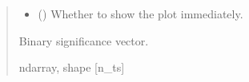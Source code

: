 \documentclass[letterpaper,10pt,english]{sphinxhowto}
\begin{document}
\begin{fulllineitems}
\begin{quote}
\begin{description}
\begin{itemize}
\item {} 
\sphinxAtStartPar
{} (\sphinxstyleliteralemphasis{\sphinxupquote{, }}) \textendash{} Whether to show the plot immediately.

\end{itemize}

\sphinxAtStartPar
{} \textendash{} Binary significance vector.

\sphinxAtStartPar
ndarray, shape {[}n\_ts{]}

\end{description}\end{quote}

\end{fulllineitems}

\end{document}

